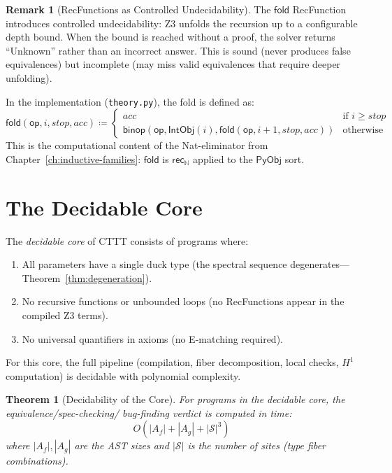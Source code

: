 \documentclass[11pt,a4paper]{report}
\theoremstyle{definition}
\newtheorem{remark}[definition]{Remark}
\theoremstyle{plain}
\newtheorem{theorem}[definition]{Theorem}
\newcommand{\Nat}{\mathbb{N}}
\newcommand{\PyObj}{\mathsf{PyObj}}
\newcommand{\op}{\mathsf{op}}
\newcommand{\Hone}{H^1}
\newcommand{\site}{\mathcal{S}}
\newcommand{\rec}{\mathsf{rec}}
\begin{document}
\begin{remark}[RecFunctions as Controlled Undecidability]
The $\mathsf{fold}$ RecFunction introduces controlled undecidability:
Z3 unfolds the recursion up to a configurable depth bound.  When the
bound is reached without a proof, the solver returns ``Unknown''
rather than an incorrect answer.  This is sound (never produces
false equivalences) but incomplete (may miss valid equivalences that
require deeper unfolding).

In the implementation (\texttt{theory.py}), the fold is defined as:
\[
  \mathsf{fold}(\op, i, \mathit{stop}, \mathit{acc}) \coloneqq
  \begin{cases}
    \mathit{acc} & \text{if } i \geq \mathit{stop} \\
    \mathsf{binop}(\op, \mathsf{IntObj}(i),
      \mathsf{fold}(\op, i{+}1, \mathit{stop}, \mathit{acc}))
      & \text{otherwise}
  \end{cases}
\]
This is the computational content of the Nat-eliminator from
Chapter~\ref{ch:inductive-families}: $\mathsf{fold}$ is
$\rec_\Nat$ applied to the $\PyObj$ sort.
\end{remark}

\section{The Decidable Core}

The \emph{decidable core} of CTTT consists of programs where:
\begin{enumerate}
  \item All parameters have a single duck type (the spectral sequence
    degenerates---Theorem~\ref{thm:degeneration}).
  \item No recursive functions or unbounded loops (no RecFunctions
    appear in the compiled Z3 terms).
  \item No universal quantifiers in axioms (no E-matching required).
\end{enumerate}

For this core, the full pipeline (compilation, fiber decomposition,
local checks, $\Hone$ computation) is decidable with polynomial
complexity.

\begin{theorem}[Decidability of the Core]
\label{thm:decidable-core}
For programs in the decidable core, the equivalence/spec-checking/
bug-finding verdict is computed in time:
\[
  O(|A_f| + |A_g| + |\site|^3)
\]
where $|A_f|, |A_g|$ are the AST sizes and $|\site|$ is the number
of sites (type fiber combinations).
\end{theorem}
\end{document}
